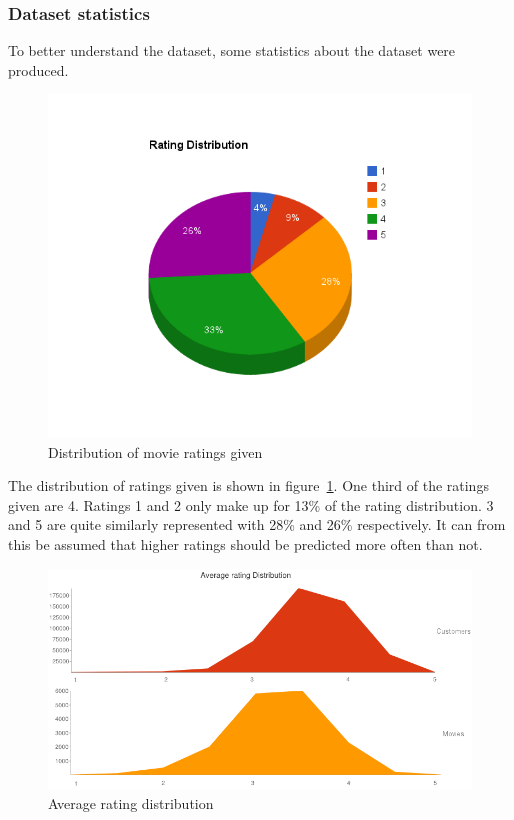 \subsubsection{Dataset statistics}

To better understand the dataset, some statistics about the dataset were produced.

\begin{figure}[H]
\includegraphics[width=5in]{image/ratingdistr.png}
\centering
\caption{Distribution of movie ratings given}
\label{figure:ratingdistr}
\end{figure}

The distribution of ratings given is shown in figure~\ref{figure:ratingdistr}. One third of the ratings given are 4. Ratings 1 and 2 only make up for 13\% of the rating distribution. 3 and 5 are quite similarly represented with 28\% and 26\% respectively. It can from this be assumed that higher ratings should be predicted more often than not.

\begin{figure}[H]
\includegraphics[width=5in]{image/avgratingdistr.png}
\centering
\caption{Average rating distribution}
\label{figure:avgratingdistr}
\end{figure}

